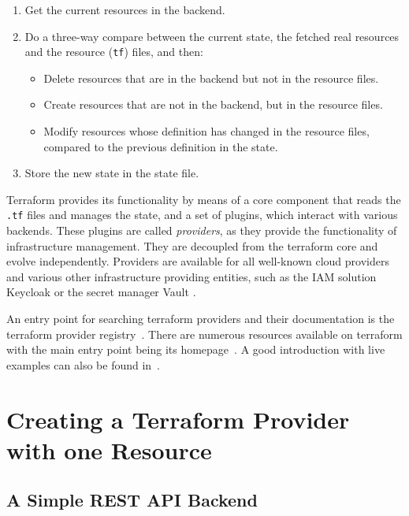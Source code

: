 \documentclass[paper=a4,fontsize=10pt,toc=listof,numbers=noenddot]{article}
\begin{document}
\begin{enumerate}
\item\label{itm:tf-read} Get the current resources in the backend.
\item\label{itm:tf-compare} Do a three-way compare between the current state, the fetched real resources and the resource (\verb'tf') files, and then:
  \begin{itemize}
  \item Delete resources that are in the backend but not in the resource files.
  \item Create resources that are not in the backend, but in the resource files.
  \item Modify resources whose definition has changed in the resource files, compared to the previous definition in the state.
  \end{itemize}
\item\label{itm:tf-create-update} Store the new state in the state file.
\end{enumerate}

Terraform provides its functionality by means of a core component that reads the \verb'.tf' files and manages the state, and a set of plugins, which interact with various backends. These plugins are called \emph{providers}, as they provide the functionality of infrastructure management. They are decoupled from the terraform core and evolve independently. Providers are available for all well-known cloud providers and various other infrastructure providing entities, such as the IAM solution Keycloak \cite{team_keycloak_nodate} or the secret manager Vault \cite{noauthor_vault_nodate}.

An entry point for searching terraform providers and their documentation is the terraform provider registry~\cite{noauthor_terraform_registry_nodate}. There are numerous resources available on terraform with the main entry point being its homepage~\cite{noauthor_terraform_nodate}. A good introduction with live examples can also be found in~\cite{brikman_terraform_2022}.


\section{Creating a Terraform Provider with one Resource}
\label{sec:creat-terr-prov}

\subsection{A Simple REST API Backend}
\label{subsec:simple-rest-api}
\end{document}
